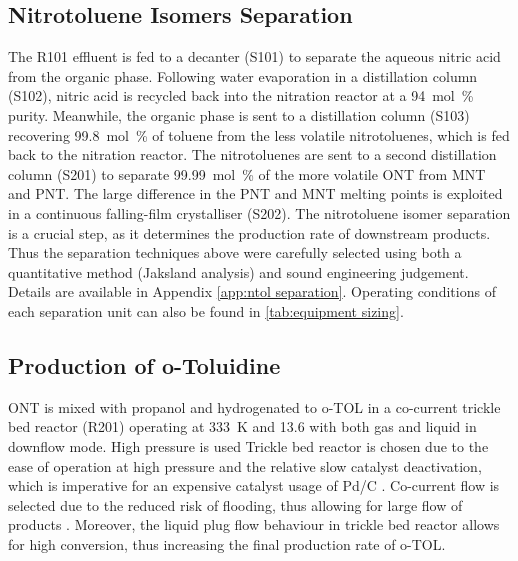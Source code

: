
\subsection{Nitrotoluene Isomers Separation}
The R101 effluent is fed to a decanter (S101) to separate the aqueous nitric acid from the organic phase. Following water evaporation in a distillation column (S102), nitric acid is recycled back into the nitration reactor at a \SI{94}{mol\percent} purity.
Meanwhile, the organic phase is sent to a distillation column (S103) recovering \SI{99.8}{mol\percent} of toluene from the less volatile nitrotoluenes, which is fed back to the nitration reactor. The nitrotoluenes are sent to a second distillation column (S201) to separate \SI{99.99}{mol\percent} of the more volatile ONT from MNT and PNT. The large difference in the PNT and MNT melting points is exploited in a continuous falling-film crystalliser (S202). 
The nitrotoluene isomer separation is a crucial step, as it determines the production rate of downstream products. Thus the separation techniques above were carefully selected using both a quantitative method (Jaksland analysis) \cite{jaksland_separation_1995} and sound engineering judgement. Details are available in Appendix \ref{app:ntol separation}. Operating conditions of each separation unit can also be found in \cref{tab:equipment sizing}. 

\subsection{Production of o-Toluidine}
ONT is mixed with propanol and hydrogenated to o-TOL in a co-current trickle bed reactor (R201) operating at \SI{333}{\K} and \SI{13.6}{\atm} with both gas and liquid in downflow mode. High pressure is used Trickle bed reactor is chosen due to the ease of operation at high pressure and the relative slow catalyst deactivation, which is imperative for an expensive catalyst usage of Pd/C \cite{vemala_hydrodynamic_nodate}. Co-current flow is selected due to the reduced risk of flooding, thus allowing for large flow of products \cite{vemala_hydrodynamic_nodate}. Moreover, the liquid plug flow behaviour in trickle bed reactor allows for high conversion, thus increasing the final production rate of o-TOL. 

